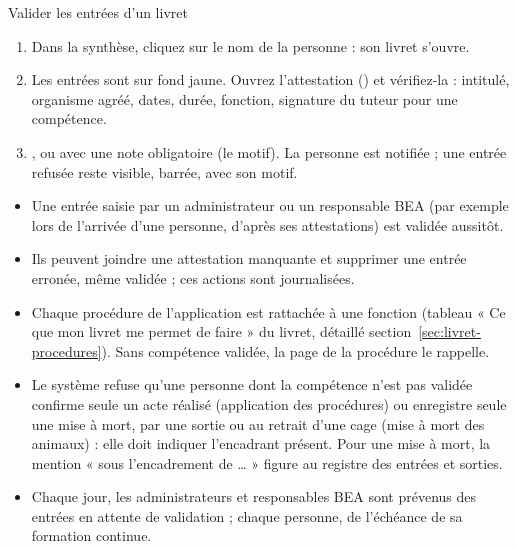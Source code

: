 \documentclass[11pt,a4paper]{article}
\begin{document}
\begin{procedure}{Valider les entrées d'un livret}
\begin{enumerate}
  \item Dans la synthèse, cliquez sur le nom de la personne : son livret
    s'ouvre.
  \item Les entrées  sont sur fond jaune. Ouvrez
    l'attestation () et vérifiez-la : intitulé, organisme agréé,
    dates, durée, fonction, signature du tuteur pour une compétence.
  \item {}, ou  avec une note obligatoire (le
    motif). La personne est notifiée ; une entrée refusée reste visible,
    barrée, avec son motif.
\end{enumerate}
\end{procedure}

\begin{regle}
\begin{itemize}
  \item Une entrée saisie par un administrateur ou un responsable BEA (par
    exemple lors de l'arrivée d'une personne, d'après ses attestations) est
    validée aussitôt.
  \item Ils peuvent joindre une attestation manquante et supprimer une
    entrée erronée, même validée ; ces actions sont journalisées.
  \item Chaque procédure de l'application est rattachée à une fonction
    (tableau « Ce que mon livret me permet de faire » du livret, détaillé
    section~\ref{sec:livret-procedures}). Sans compétence validée, la page de la procédure
    le rappelle.
  \item Le système refuse qu'une personne dont la compétence n'est pas
    validée confirme seule un acte réalisé (application des procédures) ou
    enregistre seule une mise à mort, par une sortie ou au retrait d'une cage
    (mise à mort des animaux) : elle doit indiquer l'encadrant présent. Pour
    une mise à mort, la mention « sous l'encadrement de … » figure au
    registre des entrées et sorties.
  \item Chaque jour, les administrateurs et responsables BEA sont prévenus
    des entrées en attente de validation ; chaque personne, de l'échéance de
    sa formation continue.
\end{itemize}
\end{regle}
\end{document}
